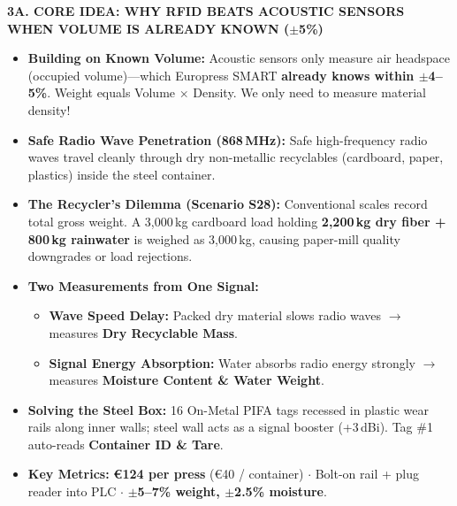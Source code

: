 \documentclass[10pt,a4paper]{article}
\begin{document}
\begin{tcolorbox}[colback=white, colframe=bordergray, arc=3pt, boxsep=2pt, left=6pt, right=6pt, top=4pt, bottom=4pt]
{\fontsize{7.8pt}{9pt}\selectfont \textbf{\color{techpurple}3A. CORE IDEA: WHY RFID BEATS ACOUSTIC SENSORS WHEN VOLUME IS ALREADY KNOWN ($\pm$5\%)}}\\[2pt]
\begin{minipage}[t]{0.49\textwidth}
  {\fontsize{7.2pt}{9.2pt}\selectfont
  \begin{itemize}
    \item \textbf{Building on Known Volume:} Acoustic sensors only measure air headspace (occupied volume)---which Europress SMART \textbf{already knows within $\pm$4--5\%}. Weight equals Volume $\times$ Density. We only need to measure material density!
    \item \textbf{Safe Radio Wave Penetration (868\,MHz):} Safe high-frequency radio waves travel cleanly through dry non-metallic recyclables (cardboard, paper, plastics) inside the steel container.
    \item \textbf{The Recycler's Dilemma (Scenario S28):} Conventional scales record total gross weight. A 3,000\,kg cardboard load holding \textbf{2,200\,kg dry fiber + 800\,kg rainwater} is weighed as 3,000\,kg, causing paper-mill quality downgrades or load rejections.
  \end{itemize}
  }
\end{minipage}%
\hfill
\begin{minipage}[t]{0.49\textwidth}
  {\fontsize{7.2pt}{9.2pt}\selectfont
  \begin{itemize}
    \item \textbf{Two Measurements from One Signal:}
      \begin{itemize}[label=--, leftmargin=8pt, itemsep=1pt]
        \item \textbf{Wave Speed Delay:} Packed dry material slows radio waves $\rightarrow$ measures \textbf{Dry Recyclable Mass}.
        \item \textbf{Signal Energy Absorption:} Water absorbs radio energy strongly $\rightarrow$ measures \textbf{Moisture Content \& Water Weight}.
      \end{itemize}
    \item \textbf{Solving the Steel Box:} 16 On-Metal PIFA tags recessed in plastic wear rails along inner walls; steel wall acts as a signal booster (+3\,dBi). Tag \#1 auto-reads \textbf{Container ID \& Tare}.
    \item \textbf{Key Metrics:} \textbf{\euro{}124 per press} (\euro{}40 / container) $\cdot$ Bolt-on rail + plug reader into PLC $\cdot$ \textbf{$\pm$5--7\% weight, $\pm$2.5\% moisture}.
  \end{itemize}
  }
\end{minipage}
\end{tcolorbox}
\vspace{-3pt}
\end{document}
